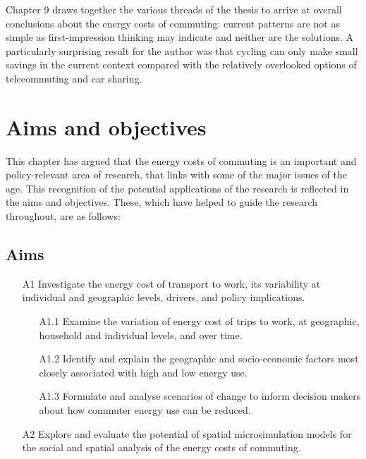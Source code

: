 \documentclass[a4paper, 11pt, twoside]{Thesis}
\begin{document}
Chapter 9 draws
together the various threads of the thesis to arrive at overall conclusions
about the energy costs of commuting: current patterns are not as simple
as first-impression thinking may indicate and neither are the solutions.
A particularly surprising result for the author was that cycling
can only make small savings in the current context compared with
the relatively overlooked options of telecommuting and car sharing.

\section{Aims and objectives} \label{s:aims}
This chapter has argued that the energy costs of commuting is an
important and policy-relevant area of research, that links with
some of the major issues of the age.
This recognition of the potential applications of the research
is reflected in the aims and objectives. These, which have
helped to guide the research throughout, are as follows:

\subsection{Aims}
\begin{itemize}
 \item[A1] Investigate the energy cost of transport to work, its variability
at individual and geographic levels, drivers, and policy implications.
  \begin{itemize}
   \item[A1.1] Examine the variation of energy cost of trips to work, at
      geographic,	household and individual levels, and over time.
    \item[A1.2] Identify and explain the geographic and socio-economic factors
most closely  associated with high and low energy use.
    \item[A1.3] Formulate and analyse scenarios of change to inform decision
    makers about how commuter energy use can be reduced.
  \end{itemize}
  \item[A2] Explore and evaluate the potential of spatial microsimulation
models for the social and spatial analysis of the energy costs of commuting.
\end{itemize}
\end{document}
